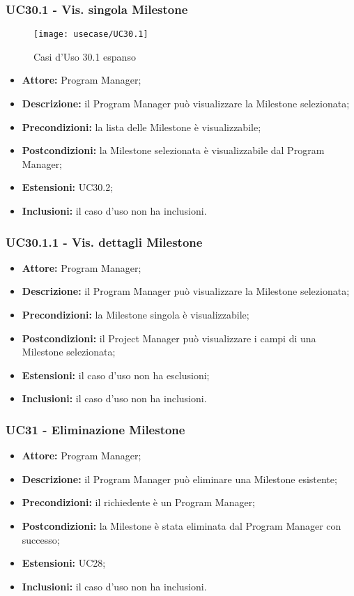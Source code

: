 \subsubsection*{UC30.1 - Vis. singola Milestone}
\begin{figure}[H] 
    \centering 
    \texttt{[image: usecase/UC30.1]} 
    \caption{Casi d'Uso 30.1 espanso}
\end{figure}
\begin{itemize}[label=$\circ$]
\item \textbf{Attore:} Program Manager;
\item \textbf{Descrizione:} il Program Manager può visualizzare la Milestone selezionata;
\item \textbf{Precondizioni:} la lista delle Milestone è visualizzabile;
\item \textbf{Postcondizioni:} la Milestone selezionata è visualizzabile dal Program Manager;
\item \textbf{Estensioni:} UC30.2;
\item \textbf{Inclusioni:} il caso d'uso non ha inclusioni.
\end{itemize}

\subsubsection*{UC30.1.1 - Vis. dettagli Milestone}
\begin{itemize}[label=$\circ$]
\item \textbf{Attore:} Program Manager;
\item \textbf{Descrizione:} il Program Manager può visualizzare la Milestone selezionata;
\item \textbf{Precondizioni:} la Milestone singola è visualizzabile;
\item \textbf{Postcondizioni:} il Project Manager può visualizzare i campi di una Milestone selezionata;
\item \textbf{Estensioni:} il caso d'uso non ha esclusioni;
\item \textbf{Inclusioni:} il caso d'uso non ha inclusioni.
\end{itemize}

\subsubsection*{UC31 - Eliminazione Milestone}
\begin{itemize}[label=$\circ$]
\item \textbf{Attore:} Program Manager;
\item \textbf{Descrizione:} il Program Manager può eliminare una Milestone esistente;
\item \textbf{Precondizioni:} il richiedente è un Program Manager;
\item \textbf{Postcondizioni:} la Milestone è stata eliminata dal Program Manager con successo;
\item \textbf{Estensioni:} UC28;
\item \textbf{Inclusioni:} il caso d'uso non ha inclusioni.
\end{itemize}